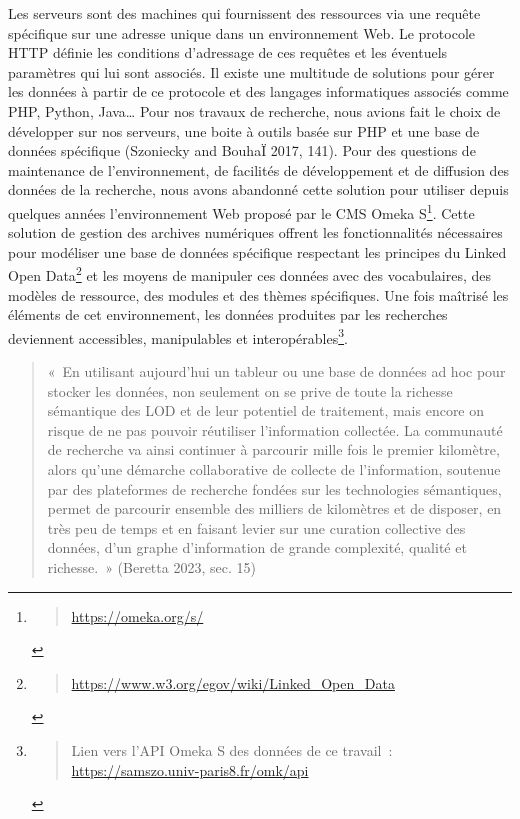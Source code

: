 \documentclass[
  letterpaper,
  DIV=11,
  numbers=noendperiod]{scrreprt}
\begin{document}
Les serveurs sont des machines qui fournissent des ressources via une
requête spécifique sur une adresse unique dans un environnement Web. Le
protocole HTTP définie les conditions d'adressage de ces requêtes et les
éventuels paramètres qui lui sont associés. Il existe une multitude de
solutions pour gérer les données à partir de ce protocole et des
langages informatiques associés comme PHP, Python, Java\ldots{} Pour nos
travaux de recherche, nous avions fait le choix de développer sur nos
serveurs, une boite à outils basée sur PHP et une base de données
spécifique (Szoniecky and BouhaÏ 2017, 141). Pour des questions de
maintenance de l'environnement, de facilités de développement et de
diffusion des données de la recherche, nous avons abandonné cette
solution pour utiliser depuis quelques années l'environnement Web
proposé par le CMS Omeka S\footnote{\begin{quote}
  \url{https://omeka.org/s/}
  \end{quote}}. Cette solution de gestion des archives numériques
offrent les fonctionnalités nécessaires pour modéliser une base de
données spécifique respectant les principes du Linked Open
Data\footnote{\begin{quote}
  \url{https://www.w3.org/egov/wiki/Linked_Open_Data}
  \end{quote}} et les moyens de manipuler ces données avec des
vocabulaires, des modèles de ressource, des modules et des thèmes
spécifiques. Une fois maîtrisé les éléments de cet environnement, les
données produites par les recherches deviennent accessibles,
manipulables et interopérables\footnote{\begin{quote}
  Lien vers l'API Omeka S des données de ce travail~:
  \url{https://samszo.univ-paris8.fr/omk/api}
  \end{quote}}.

\begin{quote}
«~En utilisant aujourd'hui un tableur ou une base de données ad hoc pour
stocker les données, non seulement on se prive de toute la richesse
sémantique des LOD et de leur potentiel de traitement, mais encore on
risque de ne pas pouvoir réutiliser l'information collectée. La
communauté de recherche va ainsi continuer à parcourir mille fois le
premier kilomètre, alors qu'une démarche collaborative de collecte de
l'information, soutenue par des plateformes de recherche fondées sur les
technologies sémantiques, permet de parcourir ensemble des milliers de
kilomètres et de disposer, en très peu de temps et en faisant levier sur
une curation collective des données, d'un graphe d'information de grande
complexité, qualité et richesse.~» (Beretta 2023, sec. 15)
\end{quote}
\end{document}
